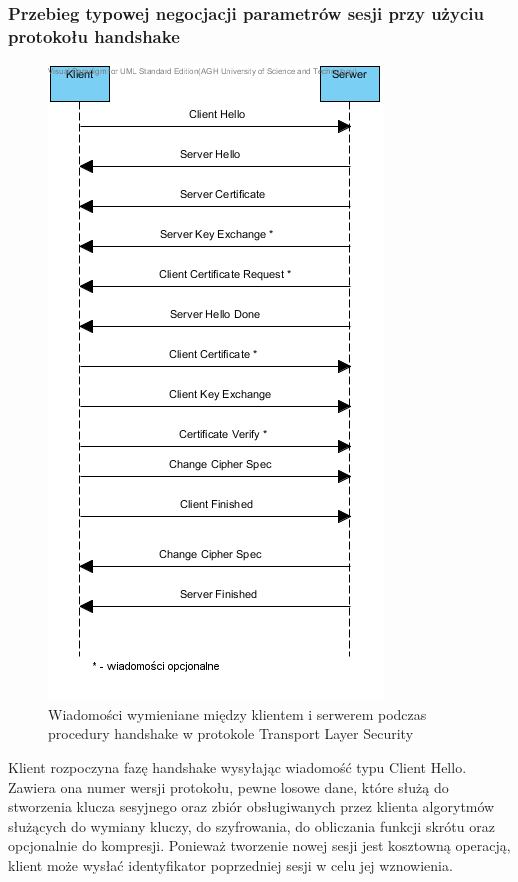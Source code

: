 \subsubsection{Przebieg typowej negocjacji parametrów sesji przy użyciu protokołu handshake}

		\begin{figure}[!htb]
			\centering
				\includegraphics{img/HandshakeTLS.png}
			\caption{Wiadomości wymieniane między klientem i serwerem podczas procedury handshake w protokole Transport Layer Security}
			\label{Wiadomości wymieniane między klientem i serwerem podczas procedury handshake w protokole Transport Layer Security}
		\end{figure}

Klient rozpoczyna fazę handshake wysyłając wiadomość typu Client Hello\cite{MSTLS03}. Zawiera ona numer wersji protokołu, pewne losowe dane, które służą do stworzenia klucza sesyjnego oraz zbiór obsługiwanych przez klienta algorytmów służących do wymiany kluczy, do szyfrowania, do obliczania funkcji skrótu oraz opcjonalnie do kompresji. Ponieważ tworzenie nowej sesji jest kosztowną operacją, klient może wysłać identyfikator poprzedniej sesji w celu jej wznowienia.

